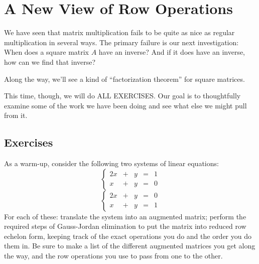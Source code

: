 \documentclass[elementsmain.tex]{subfiles}
\begin{document}
\section{A New View of Row Operations}

We have seen that matrix multiplication fails to be quite as nice as regular multiplication in several ways. The primary failure is our next investigation: When does a square matrix $A$ have an inverse? And if it does have an inverse, how can we find that inverse?

Along the way, we'll see a kind of ``factorization theorem'' for square matrices.

This time, though, we will do ALL EXERCISES. Our goal is to thoughtfully examine some of the work we have been doing and see what else we might pull from it.

\subsection*{Exercises}

\begin{exercise}
As a warm-up, consider the following two systems of linear equations:
\[\tag{A}
\left\{ \begin{array}{rrrrr}
2x & + & y & = & 1 \\
x & + & y & = & 0
\end{array}\right.
\]
\[\tag{B}
\left\{ \begin{array}{rrrrr}
2x & + & y & = & 0 \\
x & + & y & = & 1
\end{array}\right.
\]
For each of these: translate the system into an augmented matrix; perform the required steps of Gauss-Jordan elimination to put the matrix into reduced row echelon form, keeping track of the exact operations you do and the order you do them in. Be sure to make a list of the different augmented matrices you get along the way, and the row operations you use to pass from one to the other.
\end{exercise}
\end{document}
